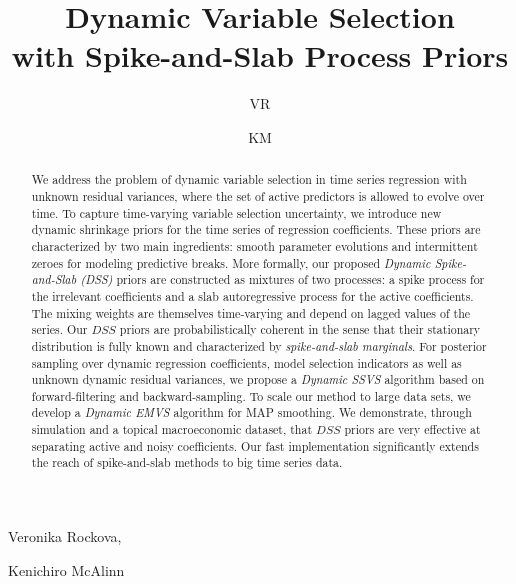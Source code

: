 \documentclass[ba]{imsart}
\numberwithin{equation}{section}
\theoremstyle{plain}
\begin{document}
\begin{frontmatter}
\title{Dynamic Variable Selection \\with Spike-and-Slab Process Priors}

\begin{aug}
\author{VR}{Veronika  Rockova},
\author{KM}{Kenichiro McAlinn}


\address[addr1]{Booth School of Business, University of Chicago,  5807 S Woodlawn Ave, Chicago, IL 60637
}


\end{aug}

\begin{abstract}
{We address the problem of dynamic variable selection in time series regression with unknown  residual variances, where the set of active predictors is allowed to evolve over time.}
To capture  time-varying variable selection uncertainty, we introduce new dynamic shrinkage priors for the time series of regression coefficients. 
These priors are characterized by two main ingredients: smooth parameter evolutions and intermittent zeroes for modeling predictive breaks. 
More formally,  our proposed {\em Dynamic Spike-and-Slab (DSS)}  priors are  constructed as mixtures of two processes: a spike process for the irrelevant coefficients and a slab autoregressive process for the active coefficients. 
The mixing weights are themselves time-varying and depend on lagged values of the series. 
Our $DSS$ priors are probabilistically coherent in the sense that their stationary distribution is fully known and characterized by {\em spike-and-slab  marginals}.   %
For  posterior sampling  over dynamic regression coefficients, model selection indicators as well as unknown dynamic residual variances, we propose a {\em Dynamic SSVS}    algorithm based on
forward-filtering and backward-sampling. To scale our method to large data sets, we  develop a {\em Dynamic EMVS} algorithm for MAP smoothing. 
We demonstrate,  through simulation and a topical  macroeconomic dataset, that $DSS$ priors are very effective at separating active and noisy coefficients.
Our fast implementation significantly extends the reach of spike-and-slab methods to big time series data.


\end{abstract}
\end{frontmatter}
\end{document}
